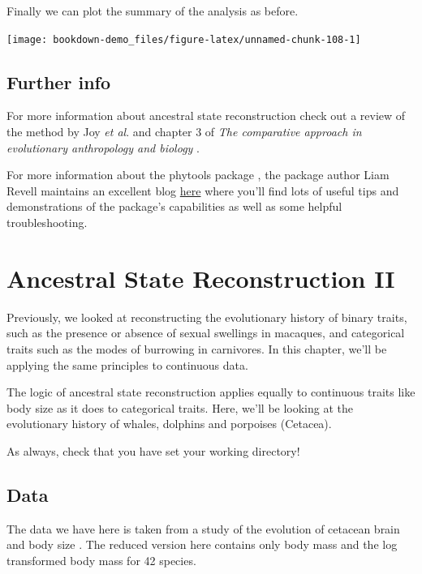 \documentclass[
]{book}
\begin{document}
Finally we can plot the summary of the analysis as before.

\begin{center}\texttt{[image: bookdown-demo\_files/figure-latex/unnamed-chunk-108-1]} \end{center}

\hypertarget{further-info-3}{%
\section{Further info}\label{further-info-3}}

For more information about ancestral state reconstruction check out a review of the method by Joy \emph{et al}. \citep{Joy16} and chapter 3 of \emph{The comparative approach in evolutionary anthropology and biology} \citep{Nunn11}.

For more information about the phytools package \citep{phytools}, the package author Liam Revell maintains an excellent blog \href{http://blog.phytools.org/}{here} where you'll find lots of useful tips and demonstrations of the package's capabilities as well as some helpful troubleshooting.

\hypertarget{asr2}{%
\chapter{Ancestral State Reconstruction II}\label{asr2}}

Previously, we looked at reconstructing the evolutionary history of binary traits, such as the presence or absence of sexual swellings in macaques, and categorical traits such as the modes of burrowing in carnivores. In this chapter, we'll be applying the same principles to continuous data.

The logic of ancestral state reconstruction applies equally to continuous traits like body size as it does to categorical traits. Here, we'll be looking at the evolutionary history of whales, dolphins and porpoises (Cetacea).

As always, check that you have set your working directory!

\hypertarget{data-2}{%
\section{Data}\label{data-2}}

The data we have here is taken from a study of the evolution of cetacean brain and body size \citep{Montgomery13}. The reduced version here contains only body mass and the log transformed body mass for 42 species.
\end{document}
